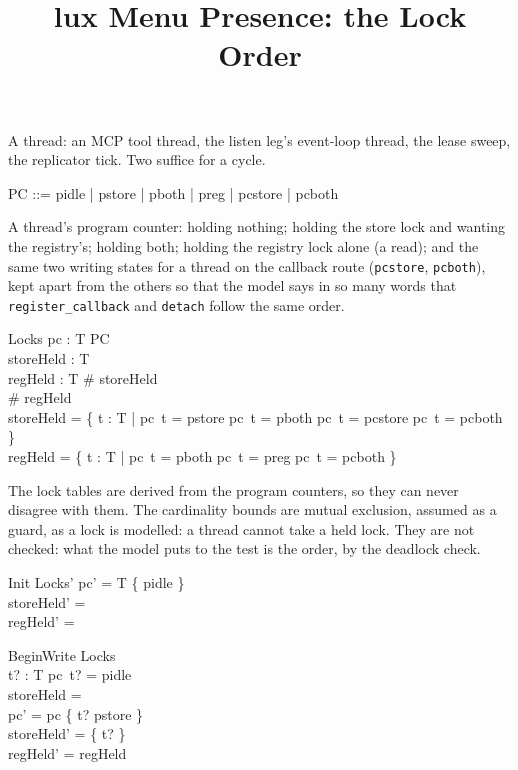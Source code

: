 \documentclass[a4paper,10pt,fleqn]{article}
\begin{document}
\title{lux Menu Presence: the Lock Order}
\maketitle

\begin{zed}
  [T]
\end{zed}

A thread: an MCP tool thread, the listen leg's event-loop thread, the lease
sweep, the replicator tick. Two suffice for a cycle.

\begin{zed}
  PC ::= pidle | pstore | pboth | preg | pcstore | pcboth
\end{zed}

A thread's program counter: holding nothing; holding the store lock and
wanting the registry's; holding both; holding the registry lock alone (a
read); and the same two writing states for a thread on the callback route
(\texttt{pcstore}, \texttt{pcboth}), kept apart from the others so that the
model says in so many words that \texttt{register\_callback} and
\texttt{detach} follow the same order.

\begin{schema}{Locks}
  pc : T \fun PC \\
  storeHeld : \power T \\
  regHeld : \power T
\where
  \# storeHeld  \\
  \# regHeld  \\
  storeHeld = \{ t : T | pc~t = pstore \lor pc~t = pboth \lor
    pc~t = pcstore \lor pc~t = pcboth \} \\
  regHeld = \{ t : T | pc~t = pboth \lor pc~t = preg \lor
    pc~t = pcboth \}
\end{schema}

The lock tables are derived from the program counters, so they can never
disagree with them. The cardinality bounds are mutual exclusion, assumed as a
guard, as a lock is modelled: a thread cannot take a held lock. They are not
checked: what the model puts to the test is the order, by the deadlock check.

\begin{schema}{Init}
  Locks'
\where
  pc' = T \cross \{ pidle \} \\
  storeHeld' = \emptyset \\
  regHeld' = \emptyset
\end{schema}

\begin{schema}{BeginWrite}
  \Delta Locks \\
  t? : T
\where
  pc~t? = pidle \\
  storeHeld = \emptyset \\
  pc' = pc \oplus \{ t? \mapsto pstore \} \\
  storeHeld' = \{ t? \} \\
  regHeld' = regHeld
\end{schema}
\end{document}
